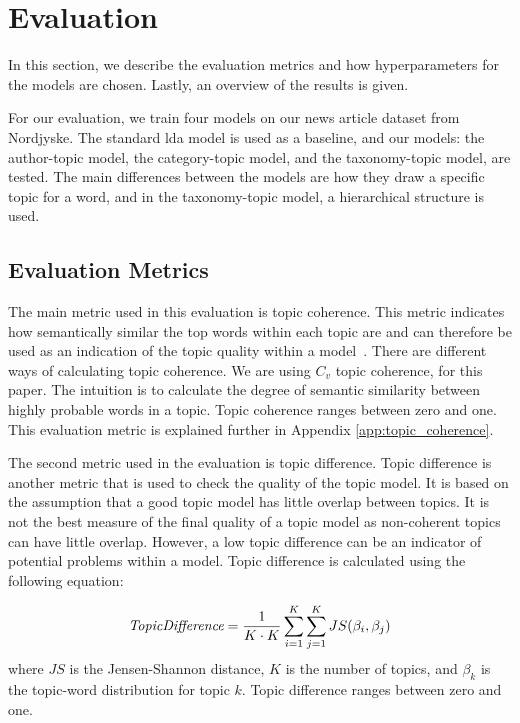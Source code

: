 \section{Evaluation}\label{sec:experiment}
In this section, we describe the evaluation metrics and how hyperparameters for the models are chosen.
Lastly, an overview of the results is given.

For our evaluation, we train four models on our news article dataset from Nordjyske.
The standard \gls{lda} model is used as a baseline, and our models: the author-topic model, the category-topic model, and the taxonomy-topic model, are tested.
The main differences between the models are how they draw a specific topic for a word, and in the taxonomy-topic model, a hierarchical structure is used.

\subsection{Evaluation Metrics}\label{sec:experiment_metrics}
The main metric used in this evaluation is topic coherence\cite{Syed2017coherence}.
This metric indicates how semantically similar the top words within each topic are and can therefore be used as an indication of the topic quality within a model~\cite{topic_coherence_2015}.
There are different ways of calculating topic coherence.
We are using $C_v$ topic coherence, for this paper.
The intuition is to calculate the degree of semantic similarity between highly probable words in a topic.
Topic coherence ranges between zero and one.
This evaluation metric is explained further in Appendix \autoref{app:topic_coherence}.

The second metric used in the evaluation is topic difference.
Topic difference is another metric that is used to check the quality of the topic model.
It is based on the assumption that a good topic model has little overlap between topics.
It is not the best measure of the final quality of a topic model as non-coherent topics can have little overlap.
However, a low topic difference can be an indicator of potential problems within a model.
Topic difference is calculated using the following equation:

\begin{equation}
	\emph{TopicDifference} = \frac{1}{K \cdot K} \sum_{i=1}^{K} \sum_{j=1}^{K} JS(\beta_{i},\beta_{j})
\end{equation}
\noindent where $JS$ is the Jensen-Shannon distance, $K$ is the number of topics, and $\beta_{k}$ is the topic-word distribution for topic $k$.
Topic difference ranges between zero and one.

